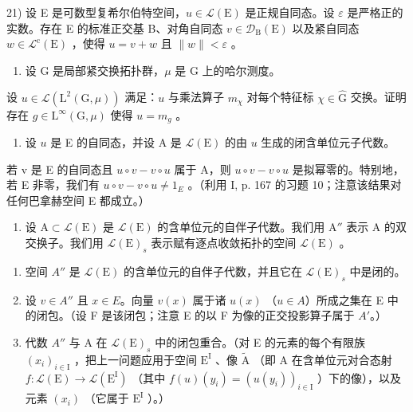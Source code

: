 21) 设 E 是可数型复希尔伯特空间，\(u \in \mathcal{L}(\mathrm{E})\) 是正规自同态。设 \(\varepsilon\) 是严格正的实数。存在 E 的标准正交基 B、对角自同态 \(v \in \mathcal{D}_{\mathrm{B}}(\mathrm{E})\) 以及紧自同态 \(w \in \mathcal{L}^{\mathrm{c}}(\mathrm{E})\) ，使得 \(u = v + w\) 且 \(\|w\| < \varepsilon\) 。

\begin{enumerate}
\def\labelenumi{\arabic{enumi})}
\setcounter{enumi}{21}
\tightlist
\item
  设 G 是局部紧交换拓扑群，\(\mu\) 是 G 上的哈尔测度。
\end{enumerate}

设 \(u \in \mathcal{L}(\mathrm{L}^2(\mathrm{G},\mu))\) 满足：\(u\) 与乘法算子 \(m_{\chi}\) 对每个特征标 \(\chi \in \widehat{\mathrm{G}}\) 交换。证明存在 \(g \in \mathrm{L}^{\infty}(\mathrm{G},\mu)\) 使得 \(u = m_g\) 。

\begin{enumerate}
\def\labelenumi{\arabic{enumi})}
\setcounter{enumi}{22}
\tightlist
\item
  设 \(u\) 是 E 的自同态，并设 A 是 \(\mathcal{L}(\mathrm{E})\) 的由 \(u\) 生成的闭含单位元子代数。
\end{enumerate}

若 v 是 E 的自同态且 \(u \circ v - v \circ u\) 属于 A，则 \(u \circ v - v \circ u\) 是拟幂零的。特别地，若 E 非零，我们有 \(u \circ v - v \circ u \neq 1_{E}\) 。（利用 I, p. 167 的习题 10；注意该结果对任何巴拿赫空间 E 都成立。）

\begin{enumerate}
\def\labelenumi{\arabic{enumi})}
\setcounter{enumi}{23}
\tightlist
\item
  设 \(\mathrm{A} \subset \mathcal{L}(\mathrm{E})\) 是 \(\mathcal{L}(\mathrm{E})\) 的含单位元的自伴子代数。我们用 \(\mathrm{A}''\) 表示 A 的双交换子。我们用 \(\mathcal{L}(\mathrm{E})_s\) 表示赋有逐点收敛拓扑的空间 \(\mathcal{L}(\mathrm{E})\) 。
\end{enumerate}

\begin{enumerate}
\def\labelenumi{\alph{enumi})}
\item
  空间 \(A''\) 是 \(\mathcal{L}(\mathrm{E})\) 的含单位元的自伴子代数，并且它在 \(\mathcal{L}(\mathrm{E})_s\) 中是闭的。
\item
  设 \(v \in A''\) 且 \(x \in E\)。向量 \(v(x)\) 属于诸 \(u(x)\) （\(u \in A\)）所成之集在 E 中的闭包。（设 F 是该闭包；注意 E 的以 F 为像的正交投影算子属于 \(A'\)。）
\item
  代数 \(A''\) 与 A 在 \(\mathcal{L}(\mathrm{E})_s\) 中的闭包重合。（对 E 的元素的每个有限族 \((x_i)_{i \in \mathrm{I}}\) ，把上一问题应用于空间 \(\mathrm{E}^{\mathrm{I}}\) 、像 \(\widetilde{\mathrm{A}}\) （即 A 在含单位元对合态射 \(f: \mathcal{L}(\mathrm{E}) \to \mathcal{L}(\mathrm{E}^{\mathrm{I}})\) （其中 \(f(u)(y_i) = (u(y_i))_{i \in \mathrm{I}}\) ）下的像），以及元素 \((x_i)\) （它属于 \(\mathrm{E}^{\mathrm{I}}\) ）。）
\end{enumerate}

